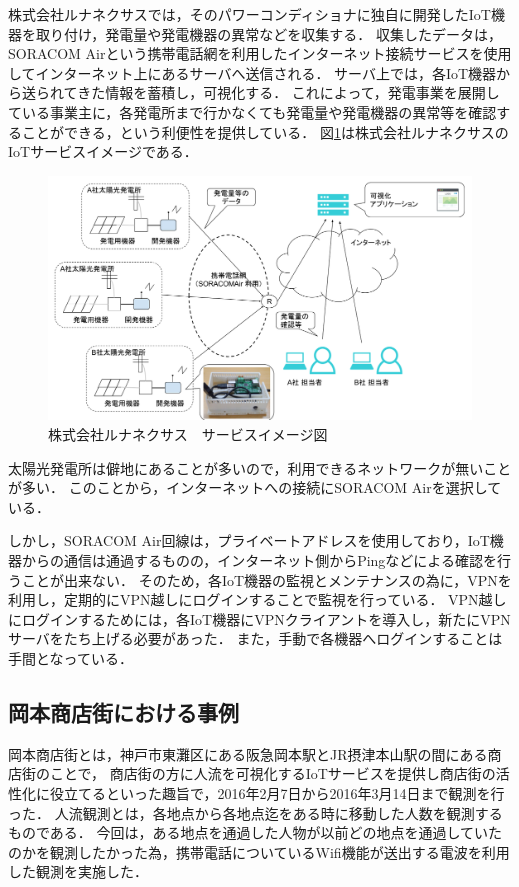 株式会社ルナネクサスでは，そのパワーコンディショナに独自に開発したIoT機器を取り付け，発電量や発電機器の異常などを収集する．
収集したデータは，SORACOM Airという携帯電話網を利用したインターネット接続サービスを使用してインターネット上にあるサーバへ送信される．
サーバ上では，各IoT機器から送られてきた情報を蓄積し，可視化する．
これによって，発電事業を展開している事業主に，各発電所まで行かなくても発電量や発電機器の異常等を確認することができる，という利便性を提供している．
図\ref{fig:lunafig}は株式会社ルナネクサスのIoTサービスイメージである．
\begin{figure}[htbp]
\includegraphics[width=16cm]{images/lunafig.png}
\caption{株式会社ルナネクサス　サービスイメージ図}
\label{fig:lunafig}
\end{figure}
太陽光発電所は僻地にあることが多いので，利用できるネットワークが無いことが多い．
このことから，インターネットへの接続にSORACOM Airを選択している．
\medskip

しかし，SORACOM Air回線は，プライベートアドレスを使用しており，IoT機器からの通信は通過するものの，インターネット側からPingなどによる確認を行うことが出来ない．
そのため，各IoT機器の監視とメンテナンスの為に，VPNを利用し，定期的にVPN越しにログインすることで監視を行っている．
VPN越しにログインするためには，各IoT機器にVPNクライアントを導入し，新たにVPNサーバをたち上げる必要があった．
また，手動で各機器へログインすることは手間となっている．

\subsection{岡本商店街における事例}
岡本商店街とは，神戸市東灘区にある阪急岡本駅とJR摂津本山駅の間にある商店街のことで，
商店街の方に人流を可視化するIoTサービスを提供し商店街の活性化に役立てるといった趣旨で，2016年2月7日から2016年3月14日まで観測を行った．
人流観測とは，各地点から各地点迄をある時に移動した人数を観測するものである．
今回は，ある地点を通過した人物が以前どの地点を通過していたのかを観測したかった為，携帯電話についているWifi機能が送出する電波を利用した観測を実施した．
\medskip

